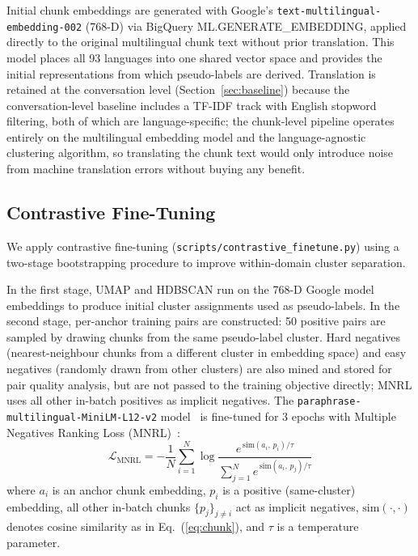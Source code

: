 \documentclass[conference]{IEEEtran}
\begin{document}
Initial chunk embeddings are generated with Google's \texttt{text-multilingual-embedding-002} (768-D) via BigQuery ML.GENERATE\_EMBEDDING, applied directly to the original multilingual chunk text without prior translation. This model places all 93 languages into one shared vector space and provides the initial representations from which pseudo-labels are derived. Translation is retained at the conversation level (Section~\ref{sec:baseline}) because the conversation-level baseline includes a TF-IDF track with English stopword filtering, both of which are language-specific; the chunk-level pipeline operates entirely on the multilingual embedding model and the language-agnostic clustering algorithm, so translating the chunk text would only introduce noise from machine translation errors without buying any benefit.

\subsection{Contrastive Fine-Tuning}
\label{sec:finetune}

We apply contrastive fine-tuning (\texttt{scripts/contrastive\_finetune.py}) using a two-stage bootstrapping procedure to improve within-domain cluster separation.

In the first stage, UMAP and HDBSCAN run on the 768-D Google model embeddings to produce initial cluster assignments used as pseudo-labels. In the second stage, per-anchor training pairs are constructed: 50 positive pairs are sampled by drawing chunks from the same pseudo-label cluster. Hard negatives (nearest-neighbour chunks from a different cluster in embedding space) and easy negatives (randomly drawn from other clusters) are also mined and stored for pair quality analysis, but are not passed to the training objective directly; MNRL uses all other in-batch positives as implicit negatives. The \texttt{paraphrase-multilingual-MiniLM-L12-v2} model~\cite{wang2020minilm} is fine-tuned for 3 epochs with Multiple Negatives Ranking Loss (MNRL)~\cite{gao2021simcse}:
\begin{equation}
  \mathcal{L}_{\mathrm{MNRL}}
  = -\frac{1}{N}\sum_{i=1}^{N}
    \log\frac{e^{\,\mathrm{sim}(a_i,\,p_i)/\tau}}
             {\displaystyle\sum_{j=1}^{N} e^{\,\mathrm{sim}(a_i,\,p_j)/\tau}}
  \label{eq:mnrl}
\end{equation}
where $a_i$ is an anchor chunk embedding, $p_i$ is a positive (same-cluster) embedding, all other in-batch chunks $\{p_j\}_{j \neq i}$ act as implicit negatives, $\mathrm{sim}(\cdot,\cdot)$ denotes cosine similarity as in Eq.~(\ref{eq:chunk}), and $\tau$ is a temperature parameter.
\end{document}

